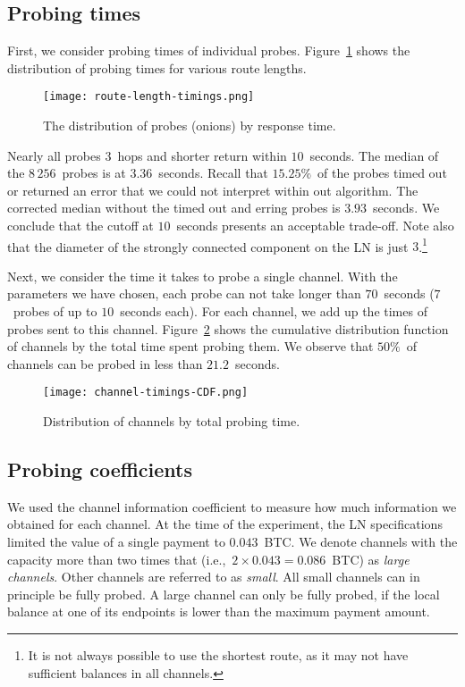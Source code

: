 \subsection{Probing times}

First, we consider probing times of individual probes.
Figure~\ref{fig:route-length-timings} shows the distribution of probing times for various route lengths.

\begin{figure}[ht]
	\centering
	\texttt{[image: route-length-timings.png]}
	\caption{The distribution of probes (onions) by response time.}
	\label{fig:route-length-timings}
\end{figure}

Nearly all probes $3$~hops and shorter return within $10$~seconds.
The median of the $8\,256$~probes is at $3.36$~seconds.
Recall that $15.25\%$~of the probes timed out or returned an error that we could not interpret within out algorithm.
The corrected median without the timed out and erring probes is $3.93$~seconds. 
We conclude that the cutoff at $10$~seconds presents an acceptable trade-off.
Note also that the diameter of the strongly connected component on the LN is just $3$.\footnote{It is not always possible to use the shortest route, as it may not have sufficient balances in all channels.}

Next, we consider the time it takes to probe a single channel.
With the parameters we have chosen, each probe can not take longer than $70$~seconds ($7$~probes of up to $10$~seconds each).
For each channel, we add up the times of probes sent to this channel.
Figure~\ref{fig:channel-timings-CDF} shows the cumulative distribution function of channels by the total time spent probing them.
We observe that $50\%$~of channels can be probed in less than $21.2$~seconds.

\begin{figure}[ht]
	\centering
	\texttt{[image: channel-timings-CDF.png]}
	\caption{Distribution of channels by total probing time.}
	\label{fig:channel-timings-CDF}
\end{figure}


\subsection{Probing coefficients}

We used the channel information coefficient to measure how much information we obtained for each channel.
At the time of the experiment, the LN specifications limited the value of a single payment to $0.043$~BTC\@.
We denote channels with the capacity more than two times that (i.e.,~$2 \times 0.043 = 0.086$~BTC) as \textit{large channels}.
Other channels are referred to as \textit{small}.
All small channels can in principle be fully probed.
A large channel can only be fully probed, if the local balance at one of its endpoints is lower than the maximum payment amount.

